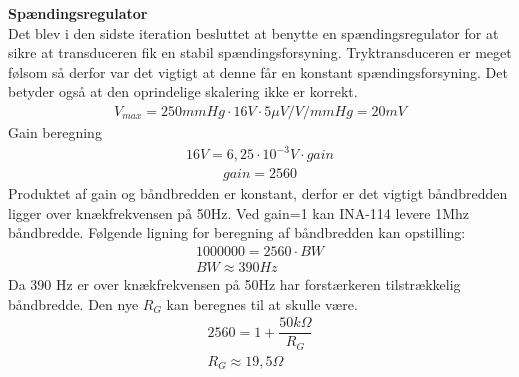 \textbf{Spændingsregulator}\\
Det blev i den sidste iteration besluttet at benytte en spændingsregulator for at sikre at transduceren fik en stabil spændingsforsyning. Tryktransduceren er meget følsom så derfor var det vigtigt at denne får en konstant spændingsforsyning. Det betyder også at den oprindelige skalering ikke er korrekt.
\begin{align}
V_{max}=250mmHg\cdot 16V\cdot5\mu V/V/mmHg =20 mV
\end{align}
Gain beregning
\begin{align}
16V = 6,25\cdot 10^{-3}V\cdot gain
\end{align}
\begin{align}
gain=2560
\end{align}
Produktet af gain og båndbredden er konstant, derfor er det vigtigt båndbredden ligger over knækfrekvensen på 50Hz. Ved gain=1 kan INA-114 levere 1Mhz båndbredde. Følgende ligning for beregning af båndbredden kan opstilling:
\begin{align}
1000000=2560\cdot BW\\
BW\approx 390Hz
\end{align}
Da 390 Hz er over knækfrekvensen på 50Hz har forstærkeren tilstrækkelig båndbredde. Den nye $R_G$ kan beregnes til at skulle være.
\begin{align}
2560=1+\dfrac{50k\Omega}{R_G}\\
R_G\approx 19,5\Omega
\end{align}
